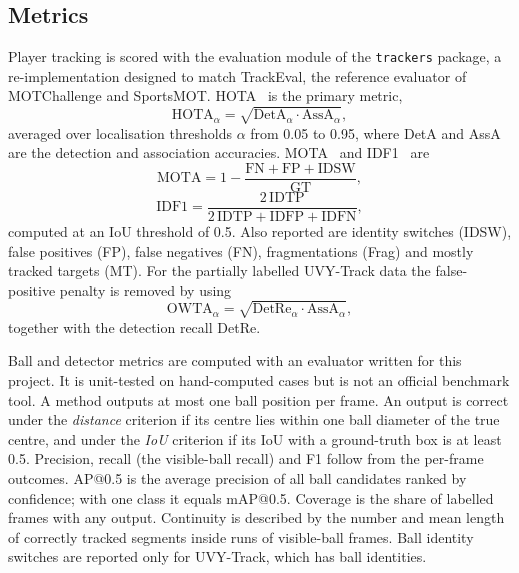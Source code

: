 \documentclass[conference]{IEEEtran}
\begin{document}
\subsection{Metrics}
Player tracking is scored with the evaluation module of the \texttt{trackers}
package, a re-implementation designed to match TrackEval, the reference evaluator
of MOTChallenge and SportsMOT. HOTA~\cite{hota} is the primary metric,
\begin{equation}
\mathrm{HOTA}_{\alpha}=\sqrt{\mathrm{DetA}_{\alpha}\cdot\mathrm{AssA}_{\alpha}},
\label{eq:hota}
\end{equation}
averaged over localisation thresholds $\alpha$ from 0.05 to 0.95, where DetA and
AssA are the detection and association accuracies. MOTA~\cite{clear} and
IDF1~\cite{idf1} are
\begin{equation}
\mathrm{MOTA}=1-\frac{\mathrm{FN}+\mathrm{FP}+\mathrm{IDSW}}{\mathrm{GT}},
\label{eq:mota}
\end{equation}
\begin{equation}
\mathrm{IDF1}=\frac{2\,\mathrm{IDTP}}{2\,\mathrm{IDTP}+\mathrm{IDFP}+\mathrm{IDFN}},
\label{eq:idf1}
\end{equation}
computed at an IoU threshold of 0.5. Also reported are identity switches (IDSW),
false positives (FP), false negatives (FN), fragmentations (Frag) and mostly
tracked targets (MT). For the partially labelled UVY-Track data the
false-positive penalty is removed by using~\cite{owta}
\begin{equation}
\mathrm{OWTA}_{\alpha}=\sqrt{\mathrm{DetRe}_{\alpha}\cdot\mathrm{AssA}_{\alpha}},
\label{eq:owta}
\end{equation}
together with the detection recall DetRe.

Ball and detector metrics are computed with an evaluator written for this
project. It is unit-tested on hand-computed cases but is not an official
benchmark tool. A method outputs at most one ball position per frame. An output
is correct under the \emph{distance} criterion if its centre lies within one ball
diameter of the true centre, and under the \emph{IoU} criterion if its IoU with a
ground-truth box is at least 0.5. Precision, recall (the visible-ball recall) and
F1 follow from the per-frame outcomes. AP@0.5 is the average precision of all
ball candidates ranked by confidence; with one class it equals mAP@0.5. Coverage
is the share of labelled frames with any output. Continuity is described by the
number and mean length of correctly tracked segments inside runs of visible-ball
frames. Ball identity switches are reported only for UVY-Track, which has ball
identities.
\end{document}
